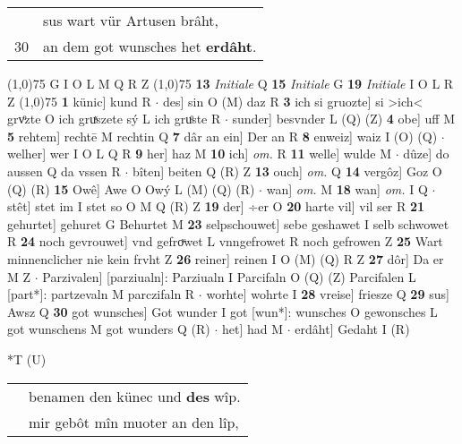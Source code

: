 \documentclass[8pt,a4paper,notitlepage]{article}
\begin{document}
\begin{table}[ht]
\begin{minipage}[t]{0.5\linewidth}
\begin{tabular}{rl}
 & sus wart vür Artusen brâht,\\ 
30 & an dem got wunsches het \textbf{erdâht}.\\ 
\end{tabular}
\scriptsize
\line(1,0){75} \newline
G I O L M Q R Z \newline
\line(1,0){75} \newline
\textbf{13} \textit{Initiale} Q  \textbf{15} \textit{Initiale} G  \textbf{19} \textit{Initiale} I O L R Z  \newline
\line(1,0){75} \newline
\textbf{1} künic] kund R  $\cdot$ des] sin O (M) daz R \textbf{3} ich si gruozte] si >ich< grvͦzte O ich gruͯszete sý L ich gruͦste R  $\cdot$ sunder] besvnder L (Q) (Z) \textbf{4} obe] uff M \textbf{5} rehtem] rechtē M rechtin Q \textbf{7} dâr an ein] Der an R \textbf{8} enweiz] waiz I (O) (Q)  $\cdot$ welher] wer I O L Q R \textbf{9} her] haz M \textbf{10} ich] \textit{om.} R \textbf{11} welle] wulde M  $\cdot$ dûze] do aussen Q da vssen R  $\cdot$ bîten] beiten Q (R) Z \textbf{13} ouch] \textit{om.} Q \textbf{14} vergôz] Goz O (Q) (R) \textbf{15} Owê] Awe O Owý L (M) (Q) (R)  $\cdot$ wan] \textit{om.} M \textbf{18} wan] \textit{om.} I Q  $\cdot$ stêt] stet im I stet so O M Q (R) Z \textbf{19} der] ÷er O \textbf{20} harte vil] vil ser R \textbf{21} gehurtet] gehuret G Behurtet M \textbf{23} selpschouwet] sebe geshawet I selb schwowet R \textbf{24} noch gevrouwet] vnd gefroͮwet L vnngefrowet R noch gefrowen Z \textbf{25} Wart minnenclicher nie kein frvht Z \textbf{26} reiner] reinen I O (M) (Q) R Z \textbf{27} dôr] Da er M Z  $\cdot$ Parzivalen] [parziualn]: Parziualn I Parcifaln O (Q) (Z) Parcifalen L [part*]: partzevaln M parczifaln R  $\cdot$ worhte] wohrte I \textbf{28} vreise] friesze Q \textbf{29} sus] Awsz Q \textbf{30} got wunsches] Got wunder I got [wun*]: wunsches O gewonsches L got wunschens M got wunders Q (R)  $\cdot$ het] had M  $\cdot$ erdâht] Gedaht I (R) \newline
\end{minipage}
\hspace{0.5cm}
\begin{minipage}[t]{0.5\linewidth}
\small
\begin{center}*T (U)
\end{center}
\begin{tabular}{rl}
 & benamen den künec und \textbf{des} wîp.\\ 
 & mir gebôt mîn muoter an den lîp,\\ 

\end{tabular}
\end{minipage}
\end{table}
\end{document}
